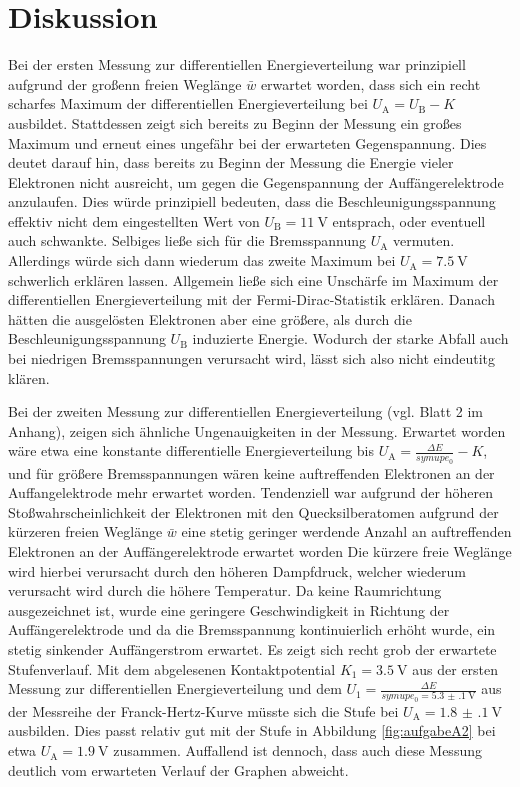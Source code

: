 \section{Diskussion}
\label{sec:Diskussion}
Bei der ersten Messung zur differentiellen Energieverteilung war prinzipiell aufgrund der großenn freien Weglänge $\bar{w}$ erwartet worden, dass sich ein recht scharfes Maximum der differentiellen Energieverteilung bei $U_\mathrm{A}=U_\mathrm{B}-K$ ausbildet. Stattdessen zeigt sich bereits zu Beginn der Messung ein großes Maximum und erneut eines ungefähr bei der erwarteten Gegenspannung. Dies deutet darauf hin, dass bereits zu Beginn der Messung die Energie vieler Elektronen nicht ausreicht, um gegen die Gegenspannung der Auffängerelektrode anzulaufen. Dies würde prinzipiell bedeuten, dass die Beschleunigungsspannung effektiv nicht dem eingestellten Wert von $U_\mathrm{B}=\SI{11}{\volt}$ entsprach, oder eventuell auch schwankte.
Selbiges ließe sich für die Bremsspannung $U_\mathrm{A}$ vermuten. Allerdings würde sich dann wiederum das zweite Maximum bei $U_\mathrm{A}=\SI{7.5}{\volt}$ schwerlich erklären lassen.
Allgemein ließe sich eine Unschärfe im Maximum der differentiellen Energieverteilung mit der Fermi-Dirac-Statistik erklären. Danach hätten die ausgelösten Elektronen aber eine größere, als durch die Beschleunigungsspannung $U_\mathrm{B}$ induzierte Energie. Wodurch der starke Abfall auch bei niedrigen Bremsspannungen verursacht wird, lässt sich also nicht eindeutitg klären.

Bei der zweiten Messung zur differentiellen Energieverteilung (vgl. Blatt 2 im Anhang), zeigen sich ähnliche Ungenauigkeiten in der Messung. Erwartet worden wäre etwa eine konstante differentielle Energieverteilung bis $U_\mathrm{A}=\frac{\Delta E}{symup{e}_0}-K$, und für größere Bremsspannungen wären keine auftreffenden Elektronen an der Auffangelektrode mehr erwartet worden.
Tendenziell war aufgrund der höheren Stoßwahrscheinlichkeit der Elektronen mit den Quecksilberatomen aufgrund der kürzeren freien Weglänge $\bar{w}$
eine stetig geringer werdende Anzahl an auftreffenden Elektronen an der Auffängerelektrode erwartet worden
Die kürzere freie Weglänge wird hierbei verursacht durch den höheren Dampfdruck, welcher wiederum verursacht wird durch die höhere Temperatur.
Da keine Raumrichtung ausgezeichnet ist, wurde eine geringere Geschwindigkeit in Richtung der Auffängerelektrode und da die Bremsspannung kontinuierlich erhöht wurde, ein stetig sinkender Auffängerstrom erwartet.
Es zeigt sich recht grob der erwartete Stufenverlauf.
Mit dem abgelesenen Kontaktpotential $K_1=\SI{3.5}{\volt}$ aus der ersten Messung zur differentiellen Energieverteilung und dem $U_1=\frac{\Delta E}{symup{e}_0=\SI{5.3(1)}{\volt}}$ aus der Messreihe der Franck-Hertz-Kurve müsste sich die Stufe bei $U_\mathrm{A}=\SI{1.8(1)}{\volt}$ ausbilden.
Dies passt relativ gut mit der Stufe in Abbildung \ref{fig:aufgabeA2} bei etwa $U_\mathrm{A}=\SI{1.9}{\volt}$ zusammen.
Auffallend ist dennoch, dass auch diese Messung deutlich vom erwarteten Verlauf der Graphen abweicht.

